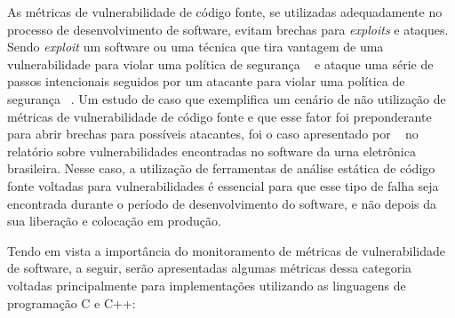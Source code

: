As métricas de vulnerabilidade de código fonte, se utilizadas adequadamente no processo de desenvolvimento de software, evitam
brechas para \textit{exploits} e ataques. Sendo \textit{exploit} um software ou uma técnica que tira vantagem de uma 
vulnerabilidade para violar uma política de segurança ~\cite{seacord&householder2005} e ataque uma série de passos intencionais 
seguidos por um atacante para violar uma política de segurança ~\cite{howard&longstaff98}. Um estudo de caso que exemplifica 
um cenário de não utilização de métricas de vulnerabilidade de código fonte e que esse fator foi preponderante para abrir
brechas para possíveis atacantes, foi o caso apresentado por ~\cite{aranha2012} no relatório sobre vulnerabilidades 
encontradas no software da urna eletrônica brasileira. Nesse caso, a utilização de ferramentas de análise estática de código
fonte voltadas para vulnerabilidades é essencial para que esse tipo de falha seja encontrada durante o período de 
desenvolvimento do software, e não depois da sua liberação e colocação em produção.

Tendo em vista a importância do monitoramento de métricas de vulnerabilidade de software, a seguir, serão apresentadas algumas
métricas dessa categoria voltadas principalmente para implementações utilizando as linguagens de programação C e C++:

